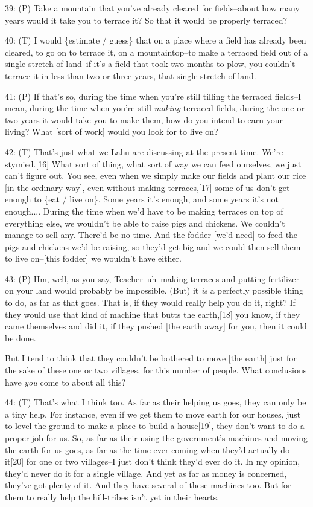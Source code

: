 39: (P) Take a mountain that you've already cleared for fields--about how many
years would it take you to terrace it? So that it would be properly terraced?

40: (T) I would \{estimate / guess\} that on a place where a field has already
been cleared, to go on to terrace it, on a mountaintop--to make a terraced field
out of a single stretch of land--if it's a field that took two months to plow,
you couldn't terrace it in less than two or three years, that single stretch of
land.

41: (P) If that's so, during the time when you're still tilling the terraced fields--I
mean, during the time when you're still \textit{making} terraced fields, during
the one or two years it would take you to make them, how do you intend to earn
your living? What [sort of work] would you look for to live on?

42: (T) That's just what we Lahu are discussing at the present time. We're stymied.[16]
What sort of thing, what sort of way we can feed ourselves, we just can't figure
out. You see, even when we simply make our fields and plant our rice [in the ordinary
way], even without making terraces,[17] some of us don't get enough to \{eat /
live on\}. Some years it's enough, and some years it's not enough.... During the
time when we'd have to be making terraces on top of everything else, we wouldn't
be able to raise pigs and chickens. We couldn't manage to sell any. There'd be
no time. And the fodder [we'd need] to feed the pigs and chickens we'd be raising,
so they'd get big and we could then sell them to live on--[this fodder] we wouldn't
have either.

43: (P) Hm, well, as you say, Teacher--uh--making terraces and putting fertilizer
on your land would probably be impossible. (But) it \textit{is} a perfectly possible
thing to do, as far as that goes. That is, if they would really help you do it,
right? If they would use that kind of machine that butts the earth,[18] you know,
if they came themselves and did it, if they pushed [the earth away] for you, then
it could be done.

But I tend to think that they couldn't be bothered to move [the earth] just for
the sake of these one or two villages, for this number of people. What conclusions
have \textit{you} come to about all this?

44: (T) That's what I think too. As far as their helping us goes, they can only
be a tiny help. For instance, even if we get them to move earth for our houses,
just to level the ground to make a place to build a house[19], they don't want
to do a proper job for us. So, as far as their using the government's machines
and moving the earth for us goes, as far as the time ever coming when they'd actually
do it[20] for one or two villages--I just don't think they'd ever do it. In my
opinion, they'd never do it for a single village. And yet as far as money is concerned,
they've got plenty of it. And they have several of these machines too. But for
them to really help the hill-tribes isn't yet in their hearts.

